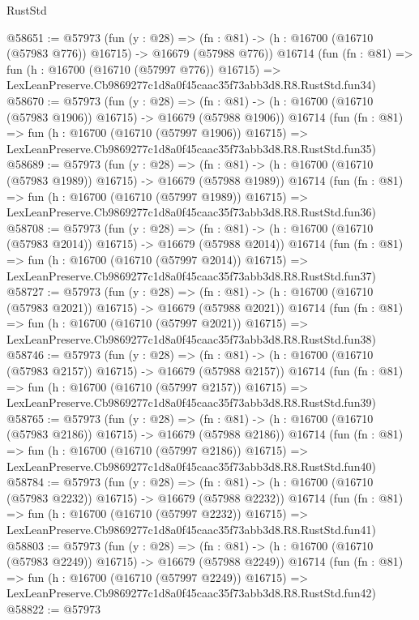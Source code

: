 \begin{lexlean}{RustStd}
\begin{coremodule}
@58651 := @57973
    (fun (y : @28) =>
    (fn : @81) -> (h : @16700 (@16710 (@57983 @776)) @16715) -> @16679 (@57988 @776))
    @16714
    (fun (fn : @81) =>
    fun (h : @16700 (@16710 (@57997 @776)) @16715) =>
    LexLeanPreserve.Cb9869277c1d8a0f45caac35f73abb3d8.R8.RustStd.fun34)
@58670 := @57973
    (fun (y : @28) =>
    (fn : @81) -> (h : @16700 (@16710 (@57983 @1906)) @16715) -> @16679 (@57988 @1906))
    @16714
    (fun (fn : @81) =>
    fun (h : @16700 (@16710 (@57997 @1906)) @16715) =>
    LexLeanPreserve.Cb9869277c1d8a0f45caac35f73abb3d8.R8.RustStd.fun35)
@58689 := @57973
    (fun (y : @28) =>
    (fn : @81) -> (h : @16700 (@16710 (@57983 @1989)) @16715) -> @16679 (@57988 @1989))
    @16714
    (fun (fn : @81) =>
    fun (h : @16700 (@16710 (@57997 @1989)) @16715) =>
    LexLeanPreserve.Cb9869277c1d8a0f45caac35f73abb3d8.R8.RustStd.fun36)
@58708 := @57973
    (fun (y : @28) =>
    (fn : @81) -> (h : @16700 (@16710 (@57983 @2014)) @16715) -> @16679 (@57988 @2014))
    @16714
    (fun (fn : @81) =>
    fun (h : @16700 (@16710 (@57997 @2014)) @16715) =>
    LexLeanPreserve.Cb9869277c1d8a0f45caac35f73abb3d8.R8.RustStd.fun37)
@58727 := @57973
    (fun (y : @28) =>
    (fn : @81) -> (h : @16700 (@16710 (@57983 @2021)) @16715) -> @16679 (@57988 @2021))
    @16714
    (fun (fn : @81) =>
    fun (h : @16700 (@16710 (@57997 @2021)) @16715) =>
    LexLeanPreserve.Cb9869277c1d8a0f45caac35f73abb3d8.R8.RustStd.fun38)
@58746 := @57973
    (fun (y : @28) =>
    (fn : @81) -> (h : @16700 (@16710 (@57983 @2157)) @16715) -> @16679 (@57988 @2157))
    @16714
    (fun (fn : @81) =>
    fun (h : @16700 (@16710 (@57997 @2157)) @16715) =>
    LexLeanPreserve.Cb9869277c1d8a0f45caac35f73abb3d8.R8.RustStd.fun39)
@58765 := @57973
    (fun (y : @28) =>
    (fn : @81) -> (h : @16700 (@16710 (@57983 @2186)) @16715) -> @16679 (@57988 @2186))
    @16714
    (fun (fn : @81) =>
    fun (h : @16700 (@16710 (@57997 @2186)) @16715) =>
    LexLeanPreserve.Cb9869277c1d8a0f45caac35f73abb3d8.R8.RustStd.fun40)
@58784 := @57973
    (fun (y : @28) =>
    (fn : @81) -> (h : @16700 (@16710 (@57983 @2232)) @16715) -> @16679 (@57988 @2232))
    @16714
    (fun (fn : @81) =>
    fun (h : @16700 (@16710 (@57997 @2232)) @16715) =>
    LexLeanPreserve.Cb9869277c1d8a0f45caac35f73abb3d8.R8.RustStd.fun41)
@58803 := @57973
    (fun (y : @28) =>
    (fn : @81) -> (h : @16700 (@16710 (@57983 @2249)) @16715) -> @16679 (@57988 @2249))
    @16714
    (fun (fn : @81) =>
    fun (h : @16700 (@16710 (@57997 @2249)) @16715) =>
    LexLeanPreserve.Cb9869277c1d8a0f45caac35f73abb3d8.R8.RustStd.fun42)
@58822 := @57973

\end{coremodule}
\end{lexlean}
